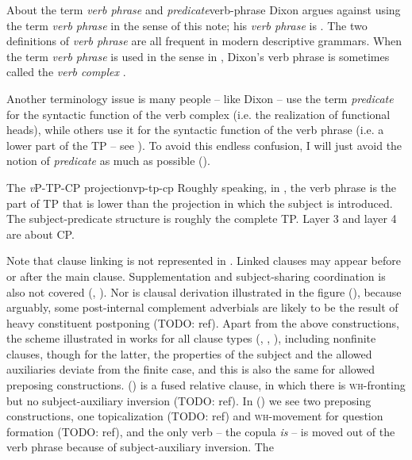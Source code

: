 \documentclass[UTF8, a4paper, oneside, scheme=plain]{ctexrep}
\newcommand*{\term}[1]{\emph{#1}}
\newcommand{\corpus}[1]{\emph{#1}}
\newcommand{\corpuscat}[1]{\textsc{#1}}
\newcommand{\vP}{\textit{v}P}
\begin{document}
\begin{infobox}{About the term \term{verb phrase} and \term{predicate}}{verb-phrase}
    Dixon argues against using the term \term{verb phrase} in the sense of this note;
    his \term{verb phrase} is .
    The two definitions of \term{verb phrase} are all frequent in modern descriptive grammars.
    When the term \term{verb phrase} is used in the sense in ,
    Dixon's verb phrase is sometimes called the \term{verb complex} \citep{Friesen2017}.

    Another terminology issue is many people -- like Dixon -- use the term \term{predicate}
    for the syntactic function of the verb complex
    (i.e. the realization of functional heads),
    while others use it for the syntactic function of the verb phrase 
    (i.e. a lower part of the TP -- see ).
    To avoid this endless confusion, 
    I will just avoid the notion of \term{predicate} as much as possible ().
\end{infobox}

\begin{theorybox}{The \vP{}-TP-CP projection}{vp-tp-cp}
    Roughly speaking, in ,
    the verb phrase is the part of TP that is lower than the projection in which the subject is introduced.
    The subject-predicate structure is roughly the complete TP.
    Layer 3 and layer 4 are about CP.
\end{theorybox}

Note that clause linking is not represented in .
Linked clauses may appear before or after the main clause.
Supplementation and subject-sharing coordination is also not covered 
(,
).
Nor is clausal derivation illustrated in the figure 
(),
because arguably, some post-internal complement adverbials 
are likely to be the result of heavy constituent postponing (TODO: ref).
Apart from the above constructions,
the scheme illustrated in  works for all clause types
(, 
,
),
including nonfinite clauses,
though for the latter,
the properties of the subject 
and the allowed auxiliaries deviate from the finite case,
and this is also the same for allowed preposing constructions. %
() is a fused relative clause,
in which there is \corpuscat{wh}-fronting 
but no subject-auxiliary inversion (TODO: ref).
In () we see two preposing constructions,
one topicalization (TODO: ref)
and \corpuscat{wh}-movement for question formation (TODO: ref),
and the only verb -- the copula \corpus{is} -- is moved out of the verb phrase
because of subject-auxiliary inversion.
The 
\end{document}
